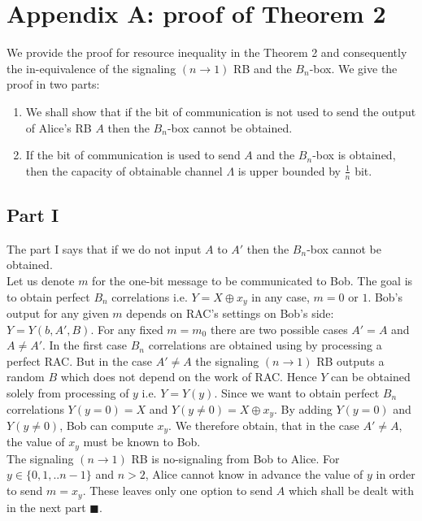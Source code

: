 
\section*{Appendix A: proof of Theorem 2}
We provide the proof for resource inequality in the Theorem 2 and consequently the in-equivalence of the signaling $(n\rightarrow 1)$ RB and the $B_n$-box. We give the proof in two parts: 
\begin{enumerate}
\item We shall show that if the bit of communication is not used to send the output of Alice's RB $A$ then the $B_n$-box cannot be obtained.
\item If the bit of communication is used to send $A$ and the $B_n$-box is obtained, then the capacity of obtainable channel $\Lambda$ is upper bounded by $\frac{1}{n}$ bit. 
\end{enumerate}
\subsection*{Part I}
The part I says that if we do not input $A$ to $A'$ then the $B_n$-box cannot be obtained.\\
Let us denote $m$ for the one-bit message to be communicated to Bob. The goal is to obtain perfect $B_n$ correlations i.e. $Y=X\oplus x_y$ in any case, $m=0$ or $1$. Bob's output for any given $m$ depends on RAC's settings on Bob's side: $Y=Y(b,A',B)$. For any fixed $m=m_0$ there are two possible cases $A'=A$ and $A\neq A'$. In the first case $B_n$ correlations are obtained using by processing a perfect RAC. But in the case $A'\neq A$ the signaling $(n \rightarrow 1)$ RB outputs a random $B$ which does not depend on the work of RAC. Hence $Y$ can be obtained solely from processing of $y$ i.e. $Y=Y(y)$. Since we want to obtain perfect $B_n$ correlations $Y(y=0)=X$ and $Y(y\neq 0)=X\oplus x_y$. By adding  $Y(y=0)$ and $Y(y\neq 0)$, Bob can compute $x_y$. We therefore obtain, that in the case $A'\neq A$, the value of $x_y$ must be known to Bob.\\
The signaling $(n\rightarrow 1)$ RB is no-signaling from Bob to Alice. For $y\in \{0,1,..n-1\}$ and $n>2$, Alice cannot know in advance the value of $y$ in order to send $m=x_y$. These leaves only one option to send $A$ which shall be dealt with in the next part $\blacksquare$.
